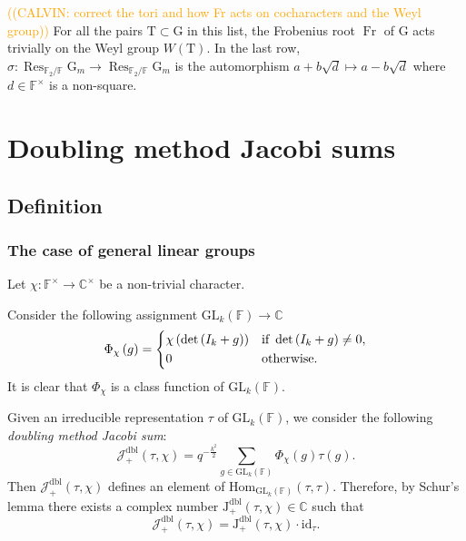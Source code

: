 \documentclass[12pt, reqno]{amsart}
\theoremstyle{definition}
\theoremstyle{definition}
\theoremstyle{definition}
\newcommand{\cComplex}{\mathbb{C}}
\newcommand{\multiplicativegroup}[1]{#1^{\times}}
\newcommand{\Hom}{\mathrm{Hom}}
\newcommand{\idmap}{\mathrm{id}}
\newcommand{\IdentityMatrix}[1]{I_{#1}}
\newcommand{\GL}{\mathrm{GL}}
\newcommand{\finiteField}{\mathbb{F}}
\newcommand{\finiteFieldExtension}[1]{\finiteField_{#1}}
\newcommand{\Frobenius}{\operatorname{Fr}}
\newcommand{\restrictionOfScalars}[3]{\operatorname{Res}_{#1 \slash #2}{#3}}
\newcommand{\multiplcativeScheme}{\algebraicGroup{G}_m}
\newcommand{\posDblJacobiSum}[2]{\mathcal{J}_{+}^{\mathrm{dbl}}\left(#1, #2\right)}
\newcommand{\posDblJacobiSumScalar}[2]{\mathrm{J}_{+}^{\mathrm{dbl}}\left(#1, #2\right)}
\newcommand{\algebraicGroup}[1]{\boldsymbol{\mathrm{#1}}}
\newcommand{\calvin}[1]{\textcolor{orange}{\sffamily ((CALVIN: #1))}}
\begin{document}
\calvin{correct the tori and how Fr acts on cocharacters and the Weyl group}
For all the pairs $\algebraicGroup{T} \subset \algebraicGroup{G}$ in this list, the Frobenius root $\Frobenius$ of $\algebraicGroup{G}$ acts trivially on the Weyl group $W\left(\algebraicGroup{T}\right)$. In the last row, $\sigma \colon \restrictionOfScalars{\finiteFieldExtension{2}}{\finiteField}{\multiplcativeScheme} \to \restrictionOfScalars{\finiteFieldExtension{2}}{\finiteField}{\multiplcativeScheme}$ is the automorphism $a + b\sqrt{d} \mapsto a - b\sqrt{d}$ where $d \in \multiplicativegroup{\finiteField}$ is a non-square.

\section{Doubling method Jacobi sums}

\subsection{Definition}

\subsubsection{The case of general linear groups}

Let $\chi \colon \multiplicativegroup{\finiteField} \to \multiplicativegroup{\cComplex}$ be a non-trivial character.

Consider the following assignment $\GL_k\left(\finiteField\right) \to \cComplex$
$$\Phi_{\chi}\left(g\right) = \begin{dcases}
	\chi\left(\det\left(\IdentityMatrix{k}+g\right)\right) & \text{if }\det\left(\IdentityMatrix{k}+g\right) \ne 0,\\
	0 & \text{otherwise.}
\end{dcases}$$
It is clear that $\Phi_{\chi}$ is a class function of $\GL_k\left(\finiteField\right)$.

Given an irreducible representation $\tau$ of $\GL_k\left(\finiteField\right)$, we consider the following \emph{doubling method Jacobi sum}:
$$\posDblJacobiSum{\tau}{\chi} = q^{-\frac{k^2}{2}} \sum_{g \in \GL_k\left(\finiteField\right)} \Phi_{\chi}\left(g\right) \tau\left(g\right).$$
Then $\posDblJacobiSum{\tau}{\chi}$ defines an element of $\Hom_{\GL_k\left(\finiteField\right)}\left(\tau, \tau\right)$. Therefore, by Schur's lemma there exists a complex number $\posDblJacobiSumScalar{\tau}{\chi} \in \cComplex$ such that $$\posDblJacobiSum{\tau}{\chi} = \posDblJacobiSumScalar{\tau}{\chi} \cdot \idmap_\tau.$$ 
\end{document}
